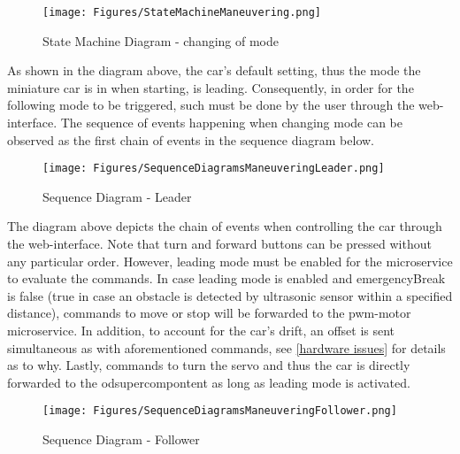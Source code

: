 \documentclass[12pt]{article}
\begin{document}
\FloatBarrier %
\begin{figure}[ht!]
\centering
\texttt{[image: Figures/StateMachineManeuvering.png]}
\caption{State Machine Diagram - changing of mode}
\label{fig:STM_maneuvering}
\end{figure}
\FloatBarrier %

As shown in the diagram above, the car's default setting, thus the mode the miniature car is in when starting, is leading. Consequently, in order for the following mode to be triggered, such must be done by the user through the web-interface. The sequence of events happening when changing mode can be observed as the first chain of events in the sequence diagram below.
\FloatBarrier %
\begin{figure}[ht!]
\centering
\texttt{[image: Figures/SequenceDiagramsManeuveringLeader.png]}
\caption{Sequence Diagram - Leader}
\label{fig:SD_maneuvering_leader}
\end{figure}
\FloatBarrier %

The diagram above depicts the chain of events when controlling the car through the web-interface. Note that turn and forward buttons can be pressed without any particular order. However, leading mode must be enabled for the microservice to evaluate the commands. In case leading mode is enabled and emergencyBreak is false (true in case an obstacle is detected by ultrasonic sensor within a specified distance), commands to move or stop will be forwarded to the pwm-motor microservice. In addition, to account for the car's drift, an offset is sent simultaneous as with aforementioned commands, see \ref{hardware issues} for details as to why. Lastly, commands to turn the servo and thus the car is directly forwarded to the odsupercompontent as long as leading mode is activated.

\FloatBarrier %
\begin{figure}[ht!]
\centering
\texttt{[image: Figures/SequenceDiagramsManeuveringFollower.png]}
\caption{Sequence Diagram - Follower}
\label{fig:SD_maneuvering_follower}
\end{figure}
\FloatBarrier %
\end{document}
